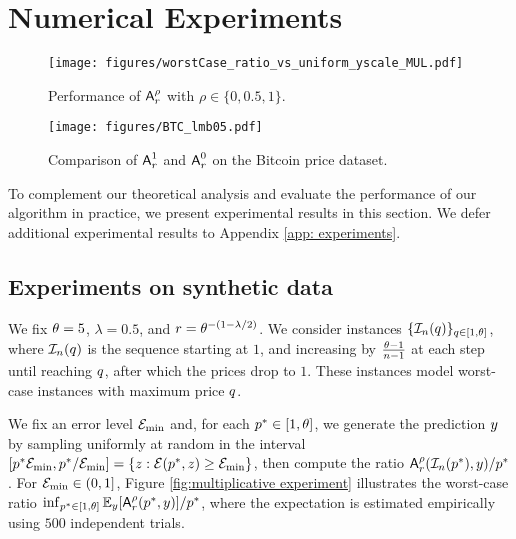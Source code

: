 \section{Numerical Experiments}\label{sec: experiments}


\begin{figure}[t]
    \begin{minipage}{0.49\textwidth}
    \centering
    \texttt{[image: figures/worstCase\_ratio\_vs\_uniform\_yscale\_MUL.pdf]}
    \caption{Performance of $\mbox{\textup{\textsf{A}}}^\rho_r$ with $\rho \in \{0,0.5,1\}$.}
    \label{fig:multiplicative experiment}
    \end{minipage}
    \hfill
    \begin{minipage}{0.49\textwidth}
    \centering
    \texttt{[image: figures/BTC\_lmb05.pdf]}
    \caption{Comparison of $\mbox{\textup{\textsf{A}}}^1_r$ and $\mbox{\textup{\textsf{A}}}^0_r$ on the Bitcoin price dataset.}
    \label{fig:BTC-lmb0.5}
    \end{minipage}
\end{figure}

To complement our theoretical analysis and evaluate the performance of our algorithm in practice, we present experimental results in this section. We defer additional experimental results to Appendix \ref{app: experiments}.

\subsection{Experiments on synthetic data}
We fix $\theta = 5$, $\lambda = 0.5$, and $r = \theta^{-(1-\lambda/2)}$. We consider instances $\{\mathcal{I}_n(q)\}_{q \in [1,\theta]}$, where $\mathcal{I}_n(q)$ is the sequence starting at $1$, and increasing by $\frac{\theta-1}{n-1}$ at each step until reaching $q$, after which the prices drop to $1$. These instances model worst-case instances with maximum price $q$.



We fix an error level $\mathcal{E}_{\min}$ and,
for each $p^* \in [1,\theta]$, we generate the prediction $y$ by sampling uniformly at random in the interval $[p^* \mathcal{E}_{\min}, p^* / \mathcal{E}_{\min}] = \{z: \mathcal{E}(p^*, z) \geq \mathcal{E}_{\min}\}$, then compute the ratio $\mbox{\textup{\textsf{A}}}^\rho_r (\mathcal{I}_n(p^*), y)/p^*$. For $\mathcal{E}_{\min} \in (0,1]$, Figure \ref{fig:multiplicative experiment} illustrates the worst-case ratio $\inf_{p^* \in [1,\theta]} \mathbb{E}_y[\mbox{\textup{\textsf{A}}}^\rho_r(p^*,y)]/p^*$, 
where the expectation is estimated empirically using $500$ independent trials.  

